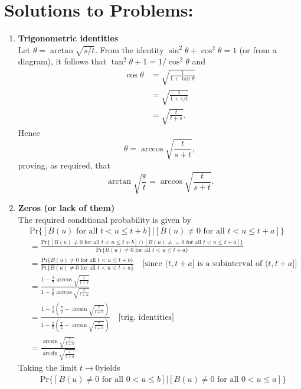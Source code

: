 \documentclass[11pt,a4paper]{article}
\begin{document}
  \section*{Solutions to Problems:}
  \begin{enumerate}
    \item \textbf{Trigonometric identities}\\
    Let $\theta = \arctan\sqrt{s/t}$. From the identity $\sin^2\theta + \cos^2\theta = 1$ (or from a diagram), it follows that $\tan^2\theta + 1 = 1/\cos^2\theta$ and
    \begin{align*}
      \cos\theta
      &= \sqrt{\frac{1}{1 + \tan\theta}}\\
      &= \sqrt{\frac{1}{1 + s/t}}\\
      &= \sqrt{\frac{t}{t + s}}.
    \end{align*}
    Hence
    $$
    \theta = \arccos\sqrt{\frac{t}{s + t}},
    $$
    proving, as required, that
    $$
    \arctan\sqrt{\frac{s}{t}} = \arccos\sqrt{\frac{t}{s + t}}.
    $$
    \item \textbf{Zeros (or lack of them)}\\
    The required conditional probability is given by
    \begin{align*}
      &\text{Pr}\{[\text{$B(u)$ for all $t < u \leq t + b$}] | [\text{$B(u) \neq 0$ for all $t < u \leq t + a$}]\}\\
      &= \frac{\text{Pr}\{[\text{$B(u) \neq 0$ for all $t < u \leq t + b$}] \cap [\text{$B(u) \neq = 0$ for all $t < u \leq t+a$}]\}}{\text{Pr}\{\text{$B(u) \neq 0$ for all $t < u \leq t + a$}\}}\\
      &= \frac{\text{Pr}\{\text{$B(u)\neq 0$ for all $t < u \leq t + b$}\}}{\text{Pr}\{\text{$B(u) \neq 0$ for all $t < u \leq t + a$}\}}\quad \text{[since $(t, t + a]$ is a subinterval of $(t, t + a]$]}\\
      &= \frac{1 - \frac{2}{\pi}\arccos\sqrt{\frac{t}{t + b}}}{1 - \frac{2}{\pi}\arccos\sqrt{\frac{t}{t + a}}}\\
      &= \frac{1 - \frac{2}{\pi}\left(\frac{\pi}{2} - \arcsin\sqrt{\frac{t}{t + b}}\right)}{1 - \frac{2}{\pi}\left(\frac{\pi}{2} - \arcsin\sqrt{\frac{t}{t + a}}\right)}\quad\text{[trig. identities]}\\
      &= \frac{\arcsin\sqrt{\frac{t}{t + b}}}{\arcsin\sqrt{\frac{t}{t + a}}}.
    \end{align*}
    Taking the limit $t \to 0$yields
    \begin{align*}
      &\text{Pr}\{[\text{$B(u) \neq 0$ for all $0 < u \leq b$}] | [\text{$B(u) \neq 0$ for all $0 < u \leq a$}]\}\\

\end{align*}
\end{enumerate}
\end{document}
